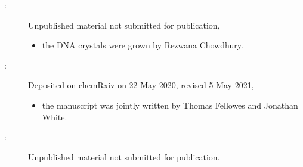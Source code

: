 {\begin{description}
    \item[:] Unpublished material not submitted for publication,
    \begin{itemize}
        \item the DNA crystals were grown by Rezwana Chowdhury.
    \end{itemize}
    \item[:] Deposited on chemRxiv on 22 May 2020, revised 5 May 2021,
    \begin{itemize}
        \item the manuscript was jointly written by Thomas Fellowes and Jonathan White.
    \end{itemize}
    \item[:] Unpublished material not submitted for publication.
\end{description}
}